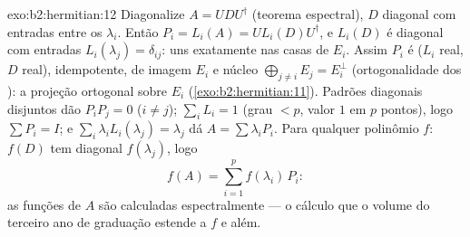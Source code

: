 \begin{solution}{exo:b2:hermitian:12}
Diagonalize $A = U D U^\dagger$ (teorema espectral), $D$ diagonal
com entradas entre os $\lambda_i$. Então $P_i = L_i(A) = U
L_i(D)U^\dagger$, e $L_i(D)$ é diagonal com entradas
$L_i(\lambda_j) = \delta_{ij}$: uns exatamente nas casas de
$E_i$. Assim $P_i$ é  ($L_i$ real, $D$ real), idempotente,
de imagem $E_i$ e núcleo $\bigoplus_{j\neq i}E_j = E_i^\perp$
(ortogonalidade dos ): a projeção ortogonal sobre
$E_i$ (\cref{exo:b2:hermitian:11}). Padrões diagonais disjuntos
dão $P_iP_j = 0$ ($i \neq j$); $\sum_i L_i = 1$ (grau $< p$,
valor $1$ em $p$ pontos), logo $\sum P_i = I$; e $\sum_i
\lambda_iL_i(\lambda_j) = \lambda_j$ dá $A = \sum
\lambda_iP_i$. Para qualquer polinômio $f$: $f(D)$ tem diagonal
$f(\lambda_j)$, logo
\[
f(A) = \sum_{i=1}^{p} f(\lambda_i)\,P_i :
\]
as funções de $A$ são calculadas espectralmente --- o cálculo que
o volume do terceiro ano de graduação estende a $f$  e além.
\end{solution}

